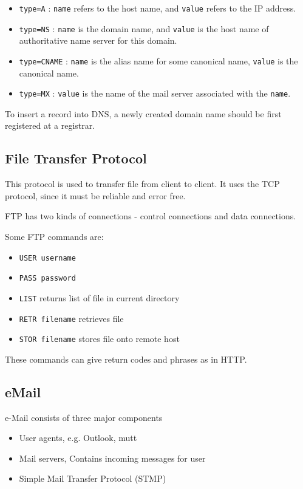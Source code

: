 \documentclass[12pt,letterpaper]{article}
\theoremstyle{definition}
\begin{document}
\begin{itemize}
  \item \texttt{type=A} : \texttt{name} refers to the host name, and \texttt{value} refers to the IP address.
  \item \texttt{type=NS} : \texttt{name} is the domain name, and \texttt{value} is the host name of authoritative name server for this domain.
  \item \texttt{type=CNAME} : \texttt{name} is the alias name for some canonical name, \texttt{value} is the canonical name.
\item \texttt{type=MX} : \texttt{value} is the name of the mail server associated with the \texttt{name}.
\end{itemize}

To insert a record into DNS, a newly created domain name should be first registered at a registrar.

\subsection{File Transfer Protocol}

This protocol is used to transfer file from client to client. It uses the TCP protocol, since it must be reliable and error free.

FTP has two kinds of connections - control connections and data connections.

Some FTP commands are:

\begin{itemize}
  \item \texttt{USER username} 
  \item \texttt{PASS password} 
  \item \texttt{LIST} returns list of file in current directory
  \item \texttt{RETR filename} retrieves file
  \item \texttt{STOR filename} stores file onto remote host
\end{itemize}

These commands can give return codes and phrases as in HTTP.

\subsection{eMail}

e-Mail consists of three major components

\begin{itemize}
  \item User agents, e.g. Outlook, mutt
  \item Mail servers, Contains incoming messages for user
  \item Simple Mail Transfer Protocol (STMP)
\end{itemize}
\end{document}
